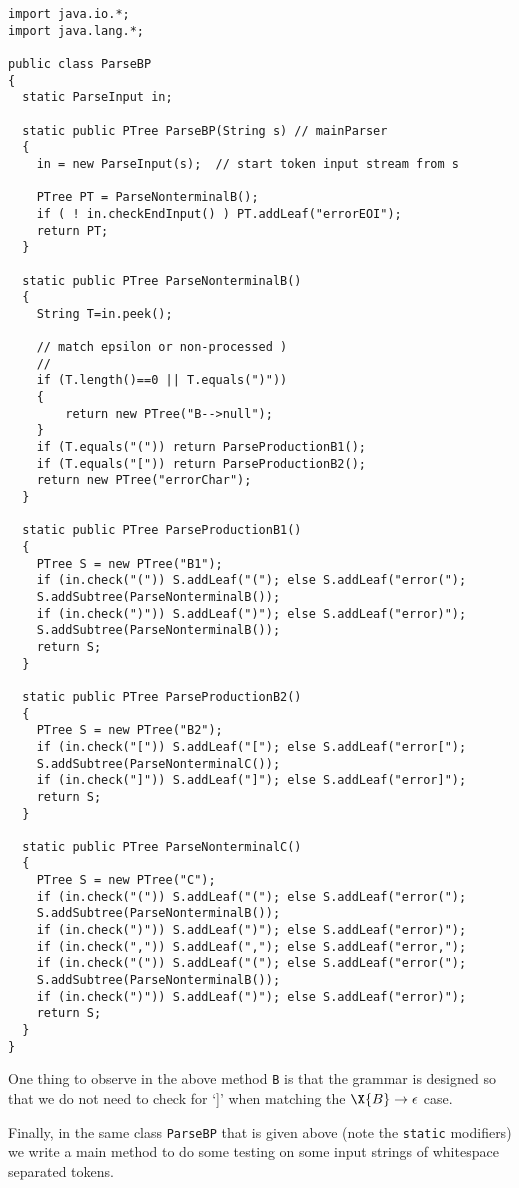 {\footnotesize%
\renewcommand{\ttdefault}{pcr} %
\begin{verbatim}
import java.io.*;
import java.lang.*;

public class ParseBP 
{ 
  static ParseInput in;

  static public PTree ParseBP(String s) // mainParser
  {
    in = new ParseInput(s);  // start token input stream from s

    PTree PT = ParseNonterminalB();
    if ( ! in.checkEndInput() ) PT.addLeaf("errorEOI"); 
    return PT;  
  }

  static public PTree ParseNonterminalB()
  {
    String T=in.peek();

    // match epsilon or non-processed )
    //
    if (T.length()==0 || T.equals(")"))  
    { 
        return new PTree("B-->null"); 
    }
    if (T.equals("(")) return ParseProductionB1();
    if (T.equals("[")) return ParseProductionB2(); 
    return new PTree("errorChar"); 
  }

  static public PTree ParseProductionB1()
  {
    PTree S = new PTree("B1");
    if (in.check("(")) S.addLeaf("("); else S.addLeaf("error(");
    S.addSubtree(ParseNonterminalB());
    if (in.check(")")) S.addLeaf(")"); else S.addLeaf("error)");
    S.addSubtree(ParseNonterminalB());
    return S;
  }

  static public PTree ParseProductionB2()
  {
    PTree S = new PTree("B2");
    if (in.check("[")) S.addLeaf("["); else S.addLeaf("error[");
    S.addSubtree(ParseNonterminalC());
    if (in.check("]")) S.addLeaf("]"); else S.addLeaf("error]");
    return S;
  }

  static public PTree ParseNonterminalC()
  {
    PTree S = new PTree("C");
    if (in.check("(")) S.addLeaf("("); else S.addLeaf("error(");
    S.addSubtree(ParseNonterminalB());
    if (in.check(")")) S.addLeaf(")"); else S.addLeaf("error)");
    if (in.check(",")) S.addLeaf(","); else S.addLeaf("error,");
    if (in.check("(")) S.addLeaf("("); else S.addLeaf("error(");
    S.addSubtree(ParseNonterminalB());
    if (in.check(")")) S.addLeaf(")"); else S.addLeaf("error)");
    return S;
  }
}
\end{verbatim}%
}%

One thing to observe in the above method
\texttt{B}
is that the grammar is designed so that we do not need to check for `]' 
when matching the $\X{B}\rightarrow \epsilon$ case.

Finally, in the same class \verb|ParseBP| that is given above (note the
\verb|static| modifiers) we write a 
main method to do some testing on some input strings of whitespace
separated tokens.
 
